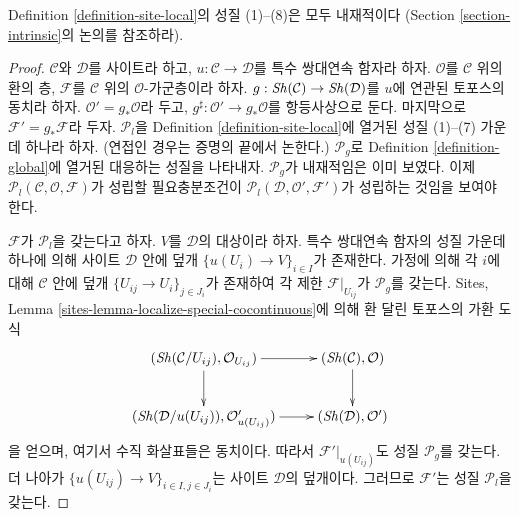 \begin{lemma}
\label{lemma-special-locally-free}
Definition \ref{definition-site-local}의 성질 (1)--(8)은 모두 내재적이다
(Section \ref{section-intrinsic}의 논의를 참조하라).
\end{lemma}

\begin{proof}
$\mathcal{C}$와 $\mathcal{D}$를 사이트라 하고,
$u : \mathcal{C} \to \mathcal{D}$를 특수 쌍대연속 함자라 하자.
$\mathcal{O}$를 $\mathcal{C}$ 위의 환의 층, $\mathcal{F}$를
$\mathcal{C}$ 위의 $\mathcal{O}$-가군층이라 하자.
$g : \mathop{\mathit{Sh}}\nolimits(\mathcal{C}) \to \mathop{\mathit{Sh}}\nolimits(\mathcal{D})$를 $u$에 연관된 토포스의
동치라 하자. $\mathcal{O}' = g_*\mathcal{O}$라 두고,
$g^\sharp : \mathcal{O}' \to g_*\mathcal{O}$를 항등사상으로 둔다.
마지막으로 $\mathcal{F}' = g_*\mathcal{F}$라 두자. $\mathcal{P}_l$을
Definition \ref{definition-site-local}에 열거된 성질 (1)--(7) 가운데 하나라
하자. (연접인 경우는 증명의 끝에서 논한다.) $\mathcal{P}_g$로
Definition \ref{definition-global}에 열거된 대응하는 성질을 나타내자.
$\mathcal{P}_g$가 내재적임은 이미 보였다. 이제
$\mathcal{P}_l(\mathcal{C}, \mathcal{O}, \mathcal{F})$가 성립할 필요충분조건이
$\mathcal{P}_l(\mathcal{D}, \mathcal{O}', \mathcal{F}')$가 성립하는 것임을
보여야 한다.

\medskip\noindent
$\mathcal{F}$가 $\mathcal{P}_l$을 갖는다고 하자. $V$를 $\mathcal{D}$의
대상이라 하자. 특수 쌍대연속 함자의 성질 가운데 하나에 의해 사이트
$\mathcal{D}$ 안에 덮개 $\{u(U_i) \to V\}_{i \in I}$가 존재한다.
가정에 의해 각 $i$에 대해 $\mathcal{C}$ 안에 덮개
$\{U_{ij} \to U_i\}_{j \in J_i}$가 존재하여 각 제한
$\mathcal{F}|_{U_{ij}}$가 $\mathcal{P}_g$를 갖는다. Sites, Lemma
\ref{sites-lemma-localize-special-cocontinuous}에 의해 환 달린 토포스의
가환 도식
$$
\xymatrix{
(\Sh(\mathcal{C}/U_{ij}), \mathcal{O}_{U_{ij}}) \ar[r] \ar[d] &
(\Sh(\mathcal{C}), \mathcal{O}) \ar[d] \\
(\Sh(\mathcal{D}/u(U_{ij})), \mathcal{O}'_{u(U_{ij})}) \ar[r] &
(\Sh(\mathcal{D}), \mathcal{O}')
}
$$
을 얻으며, 여기서 수직 화살표들은 동치이다. 따라서
$\mathcal{F}'|_{u(U_{ij})}$도 성질 $\mathcal{P}_g$를 갖는다. 더 나아가
$\{u(U_{ij}) \to V\}_{i \in I, j \in J_i}$는 사이트 $\mathcal{D}$의
덮개이다. 그러므로 $\mathcal{F}'$는 성질 $\mathcal{P}_l$을 갖는다.


\end{proof}

